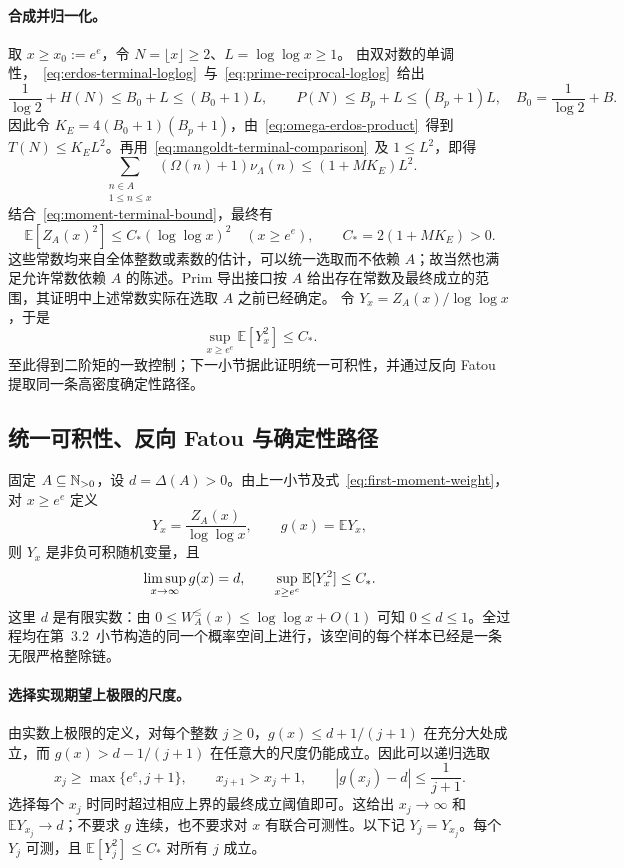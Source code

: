 \paragraph{合成并归一化。}
取 $x\ge x_0:=e^e$，令 $N=\lfloor x\rfloor\ge2$、$L=\log\log x\ge1$。
由双对数的单调性，~\eqref{eq:erdos-terminal-loglog}~与~\eqref{eq:prime-reciprocal-loglog}~给出
\[
 \frac1{\log2}+H(N)\le B_0+L\le(B_0+1)L,
 \qquad P(N)\le B_p+L\le(B_p+1)L,
 \quad B_0=\frac1{\log2}+B.
\]
因此令 $K_E=4(B_0+1)(B_p+1)$，由~\eqref{eq:omega-erdos-product}~得到 $T(N)\le K_E L^2$。再用~\eqref{eq:mangoldt-terminal-comparison}~及 $1\le L^2$，即得
\[
 \sum_{\substack{n\in A\\1\le n\le x}}(\Omega(n)+1)\nu_\Lambda(n)
 \le(1+MK_E)L^2.
\]
结合~\eqref{eq:moment-terminal-bound}，最终有
\begin{equation}\label{eq:moment-goals}
 \boxed{\mathbb E[Z_A(x)^2]\le C_* (\log\log x)^2
 \quad(x\ge e^e),\qquad C_*=2(1+MK_E)>0.}
\end{equation}
这些常数均来自全体整数或素数的估计，可以统一选取而不依赖 $A$；故当然也满足允许常数依赖 $A$ 的陈述。Prim 导出接口按 $A$ 给出存在常数及最终成立的范围，其证明中上述常数实际在选取 $A$ 之前已经确定。
令 $Y_x=Z_A(x)/\log\log x$，于是
\[
 \sup_{x\ge e^e}\mathbb E[Y_x^2]\le C_*.
\]
至此得到二阶矩的一致控制；下一小节据此证明统一可积性，并通过反向 Fatou 提取同一条高密度确定性路径。

\subsection{统一可积性、反向 Fatou 与确定性路径}
固定 $A\subseteq\mathbb N_{>0}$，设 $d=\Delta(A)>0$。由上一小节及式~\eqref{eq:first-moment-weight}，对 $x\ge e^e$ 定义
\[
 Y_x=\frac{Z_A(x)}{\log\log x},\qquad g(x)=\mathbb E Y_x,
\]
则 $Y_x$ 是非负可积随机变量，且
\begin{equation}\label{eq:fatou-moment-inputs}
 \limsup_{x\to\infty} g(x)=d,\qquad
 \sup_{x\ge e^e}\mathbb E[Y_x^2]\le C_*.
\end{equation}
这里 $d$ 是有限实数：由 $0\le W_A^{\le}(x)\le\log\log x+O(1)$ 可知 $0\le d\le1$。全过程均在第~3.2~小节构造的同一个概率空间上进行，该空间的每个样本已经是一条无限严格整除链。

\paragraph{选择实现期望上极限的尺度。}
由实数上极限的定义，对每个整数 $j\ge0$，$g(x)\le d+1/(j+1)$ 在充分大处成立，而 $g(x)>d-1/(j+1)$ 在任意大的尺度仍能成立。因此可以递归选取
\begin{equation}\label{eq:fatou-scale-sequence}
 x_j\ge\max\{e^e,j+1\},\qquad x_{j+1}>x_j+1,
 \qquad |g(x_j)-d|\le\frac1{j+1}.
\end{equation}
选择每个 $x_j$ 时同时超过相应上界的最终成立阈值即可。这给出 $x_j\to\infty$ 和 $\mathbb E Y_{x_j}\to d$；不要求 $g$ 连续，也不要求对 $x$ 有联合可测性。以下记 $Y_j=Y_{x_j}$。每个 $Y_j$ 可测，且 $\mathbb E[Y_j^2]\le C_*$ 对所有 $j$ 成立。

